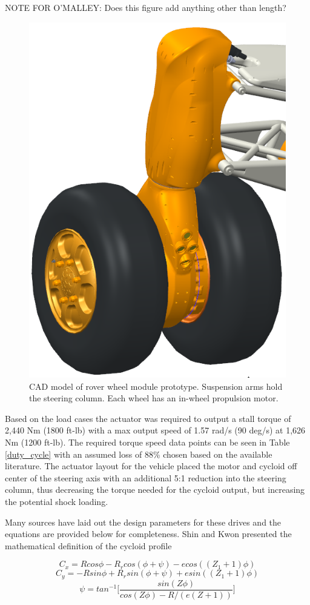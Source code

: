 \documentclass[letterpaper, 10 pt, conference]{ieeeconf}  %
\begin{document}
NOTE FOR O'MALLEY: Does this figure add anything other than length? 
   \begin{figure}[t]
      \centering
      \includegraphics[width=0.50\linewidth]{wheel_module_CAD}
      \caption{CAD model of rover wheel module prototype. Suspension arms hold the steering column. Each wheel has an in-wheel propulsion motor.}
      \label{cycloid_cartoon}
   \end{figure}
   
Based on the load cases the actuator was required to output a stall torque of 2,440 Nm (1800 ft-lb) with a max output speed of 1.57 rad/s (90 deg/s) at 1,626 Nm (1200 ft-lb). The required torque speed data points can be seen in Table \ref{duty_cycle} with an assumed loss of 88\% chosen based on the available literature. The actuator layout for the vehicle placed the motor and cycloid off center of the steering axis with an additional 5:1 reduction into the steering column, thus decreasing the torque needed for the cycloid output, but increasing the potential shock loading. 

Many sources have laid out the design parameters for these drives and the equations are provided below for completeness. Shin and Kwon \cite{on_the_lobe} presented the mathematical definition of the cycloid profile

\begin{equation} \label{eq:1}
C_x = R cos\phi -R_r cos(\phi + \psi) - e cos((Z_1 + 1)\phi) 
\end{equation}
\begin{equation} \label{eq:2}
C_y = -R sin\phi + R_r sin(\phi + \psi) + e sin((Z_1 + 1)\phi) 
\end{equation}
\begin{equation} \label{eq:3}
\psi = tan^{-1} \lbrack\frac{sin(Z \phi)}{cos(Z \phi) - R / (e(Z + 1))}\rbrack 
\end{equation}
\end{document}
